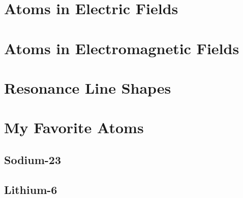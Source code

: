 \documentclass{book}
\theoremstyle{definition}
\begin{document}



\chapter{Atoms in Electric Fields}










\chapter{Atoms in Electromagnetic Fields}














\chapter{Resonance Line Shapes}








\chapter{My Favorite Atoms}

\section{Sodium-23}


\section{Lithium-6}



\end{document}
